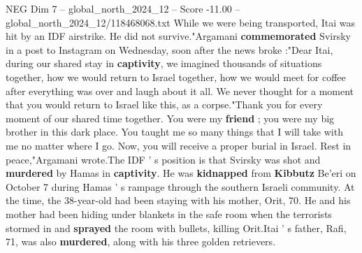 \begin{textsample}{NEG Dim 7 – global\_north\_2024\_12 – Score -11.00 – global\_north\_2024\_12/118468068.txt}
While we were being transported, Itai was hit by an IDF airstrike.
He did not survive."Argamani \textbf{commemorated} Svirsky in a post to Instagram on Wednesday, soon after the news broke :"Dear Itai, during our shared stay in \textbf{captivity}, we imagined thousands of situations together, how we would return to Israel together, how we would meet for coffee after everything was over and laugh about it all.
We never thought for a moment that you would return to Israel like this, as a corpse."Thank you for every moment of our shared time together.
You were my \textbf{friend} ; you were my big brother in this dark place.
You taught me so many things that I will take with me no matter where I go.
Now, you will receive a proper burial in Israel.
Rest in peace,"Argamani wrote.The IDF ' s position is that Svirsky was shot and \textbf{murdered} by Hamas in \textbf{captivity}.
He was \textbf{kidnapped} from \textbf{Kibbutz} Be'eri on October 7 during Hamas ' s rampage through the southern Israeli community.
At the time, the 38-year-old had been staying with his mother, Orit, 70.
He and his mother had been hiding under blankets in the safe room when the terrorists stormed in and \textbf{sprayed} the room with bullets, killing Orit.Itai ' s father, Rafi, 71, was also \textbf{murdered}, along with his three golden retrievers.

\end{textsample}
